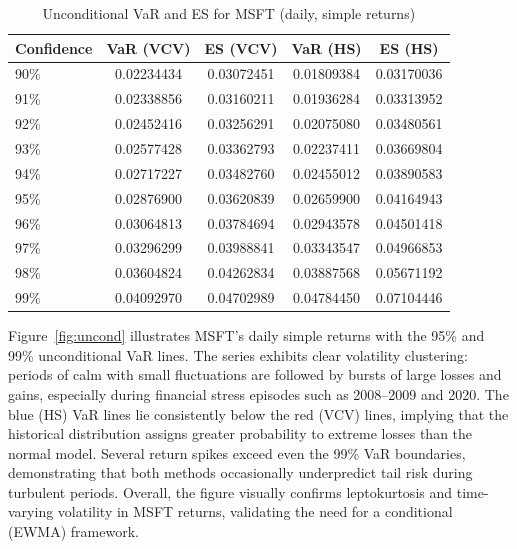\documentclass[11pt]{article}
\begin{document}
\begin{table}[H]
\centering
\caption{Unconditional VaR and ES for MSFT (daily, simple returns)}
\label{tab:uncond}
\begin{tabular}{lcccc}
\toprule
Confidence & VaR (VCV) & ES (VCV) & VaR (HS) & ES (HS) \\
\midrule
90\% & 0.02234434 & 0.03072451 & 0.01809384 & 0.03170036 \\
91\% & 0.02338856 & 0.03160211 & 0.01936284 & 0.03313952 \\
92\% & 0.02452416 & 0.03256291 & 0.02075080 & 0.03480561 \\
93\% & 0.02577428 & 0.03362793 & 0.02237411 & 0.03669804 \\
94\% & 0.02717227 & 0.03482760 & 0.02455012 & 0.03890583 \\
95\% & 0.02876900 & 0.03620839 & 0.02659900 & 0.04164943 \\
96\% & 0.03064813 & 0.03784694 & 0.02943578 & 0.04501418 \\
97\% & 0.03296299 & 0.03988841 & 0.03343547 & 0.04966853 \\
98\% & 0.03604824 & 0.04262834 & 0.03887568 & 0.05671192 \\
99\% & 0.04092970 & 0.04702989 & 0.04784450 & 0.07104446 \\
\bottomrule
\end{tabular}
\end{table}

Figure~\ref{fig:uncond} illustrates MSFT's daily simple returns with the 95\% and 99\% unconditional VaR lines.
The series exhibits clear volatility clustering: periods of calm with small fluctuations are followed by bursts of large losses and gains, especially during financial stress episodes such as 2008--2009 and 2020.
The blue (HS) VaR lines lie consistently below the red (VCV) lines, implying that the historical distribution assigns greater probability to extreme losses than the normal model.
Several return spikes exceed even the 99\% VaR boundaries, demonstrating that both methods occasionally underpredict tail risk during turbulent periods.
Overall, the figure visually confirms leptokurtosis and time-varying volatility in MSFT returns, validating the need for a conditional (EWMA) framework.
\end{document}
